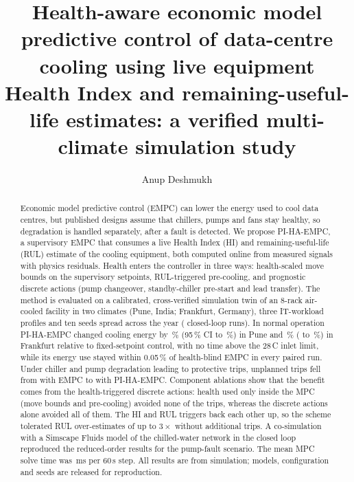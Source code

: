 \documentclass[preprint,12pt,authoryear]{elsarticle}
\begin{document}
\begin{frontmatter}

\title{Health-aware economic model predictive control of data-centre cooling using live equipment Health Index and remaining-useful-life estimates: a verified multi-climate simulation study}

\author[vit]{Anup Deshmukh}
\address[vit]{Department of Instrumentation and Control Engineering, Vishwakarma Institute of Technology, Pune, India}

\begin{abstract}
Economic model predictive control (EMPC) can lower the energy used to cool data centres, but published designs assume that chillers, pumps and fans stay healthy, so degradation is handled separately, after a fault is detected.
We propose PI-HA-EMPC, a supervisory EMPC that consumes a live Health Index (HI) and remaining-useful-life (RUL) estimate of the cooling equipment, both computed online from measured signals with physics residuals.
Health enters the controller in three ways: health-scaled move bounds on the supervisory setpoints, RUL-triggered pre-cooling, and prognostic discrete actions (pump changeover, standby-chiller pre-start and lead transfer).
The method is evaluated on a calibrated, cross-verified simulation twin of an 8-rack air-cooled facility in two climates (Pune, India; Frankfurt, Germany), three IT-workload profiles and ten seeds spread across the year (\nRuns{} closed-loop runs).
In normal operation PI-HA-EMPC changed cooling energy by \EoneCoolRelHaFixedPune\,\% (95\,\% CI \EoneCoolRelHaFixedPuneLo{} to \EoneCoolRelHaFixedPuneHi\,\%) in Pune and \EoneCoolRelHaFixedFrankfurt\,\% (\EoneCoolRelHaFixedFrankfurtLo{} to \EoneCoolRelHaFixedFrankfurtHi\,\%) in Frankfurt relative to fixed-setpoint control, with no time above the 28\,\textdegree C inlet limit, while its energy use stayed within 0.05\,\% of health-blind EMPC in every paired run.
Under chiller and pump degradation leading to protective trips, unplanned trips fell from \EtwoTripsEmpc{} with EMPC to \EtwoTripsHa{} with PI-HA-EMPC.
Component ablations show that the benefit comes from the health-triggered discrete actions: health used only inside the MPC (move bounds and pre-cooling) avoided none of the trips, whereas the discrete actions alone avoided all of them. The HI and RUL triggers back each other up, so the scheme tolerated RUL over-estimates of up to $3\times$ without additional trips.
A co-simulation with a Simscape Fluids model of the chilled-water network in the closed loop reproduced the reduced-order results for the pump-fault scenario.
The mean MPC solve time was \EsixMeanMs\,ms per 60\,s step.
All results are from simulation; models, configuration and seeds are released for reproduction.
\end{abstract}


\end{frontmatter}
\end{document}
